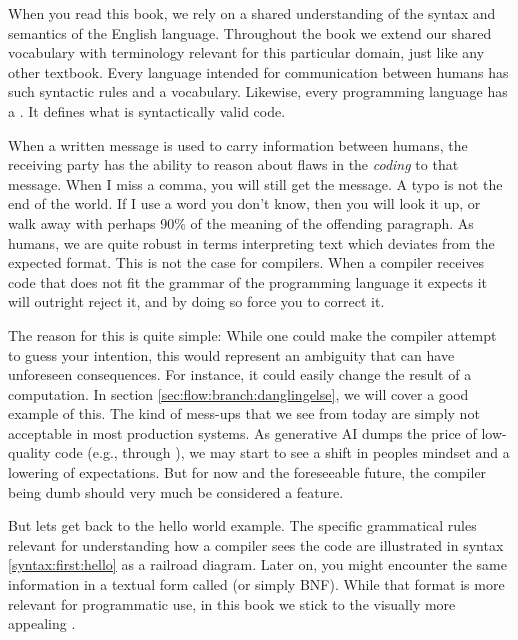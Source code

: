 When you read this book, we rely on a shared understanding of the syntax and semantics of the English language. Throughout the book we extend our shared vocabulary with terminology relevant for this particular domain, just like any other textbook. Every language intended for communication between humans has such syntactic rules and a vocabulary. Likewise, every programming language has a . It defines what is syntactically valid code.

When a written  message is used to carry information between humans, the receiving party has the ability to reason about flaws in the \textsl{coding} to that message. When I miss a comma, you will still get the message. A typo is not the end of the world. If I use a word you don't know, then you will look it up, or walk away with perhaps 90\% of the meaning of the offending paragraph. As humans, we are quite robust in terms interpreting text which deviates from the expected format. This is not the case for compilers. When a compiler receives code that does not fit the grammar of the programming language it expects it will outright reject it, and by doing so force you to correct it.

The reason for this is quite simple: While one could make the compiler attempt to guess your intention, this would represent an ambiguity that can have unforeseen consequences. For instance, it could easily change the result of a computation. In section \ref{sec:flow:branch:danglingelse}, we will cover a good example of this. The kind of mess-ups that we see from  today are simply not acceptable in most production systems. As generative AI dumps the price of low-quality code (e.g., through ), we may start to see a shift in peoples mindset and a lowering of expectations. But for now and the foreseeable future, the compiler being dumb should very much be considered a feature.

But lets get back to the hello world example. The specific grammatical rules relevant for understanding how a compiler sees the code are illustrated in syntax \ref{syntax:first:hello} as a railroad diagram. Later on, you might encounter the same information in a textual form called  (or simply BNF). While that format is more relevant for programmatic use, in this book we stick to the visually more appealing .

